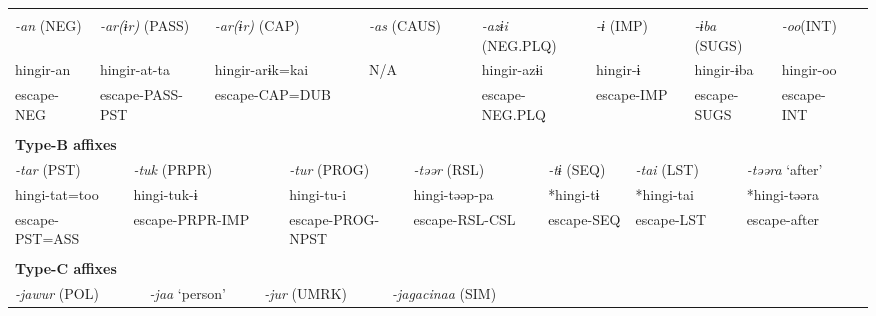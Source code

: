 \tabletail{}
\tablelasttail{}
\begin{tabularx}{\textwidth}{XXXXXXXXXXXXXXXXXXXXXXX}
\lsptoprule
\multicolumn{23}{X}{{\bfseries Type-A affixes}}\\
{ \textit{{}-an} (NEG)} & \multicolumn{5}{X}{{ \textit{{}-ar(ɨr)} (PASS)}} & \multicolumn{4}{X}{{ \textit{{}-ar(ɨr)} (CAP)}} & \multicolumn{4}{X}{{ \textit{{}-as} (CAUS)}} & \multicolumn{3}{X}{{ \textit{{}-azɨi} (NEG.PLQ)}} & \multicolumn{2}{X}{{ \textit{{}-ɨ} (IMP)}} & \multicolumn{2}{X}{{ \textit{{}-ɨba} (SUGS)}} & { \textit{{}-oo}(INT)} & \\
{ hingir-an} & \multicolumn{5}{X}{{ hingir-at-ta}} & \multicolumn{4}{X}{{ hingir-arɨk=kai}} & \multicolumn{4}{X}{{ N/A\footnotemark{}}} & \multicolumn{3}{X}{{ hingir-azɨi}} & \multicolumn{2}{X}{{ hingir-ɨ}} & \multicolumn{2}{X}{{ hingir-ɨba}} & { hingir-oo} & \\
escape-NEG & \multicolumn{5}{X}{escape-PASS-PST} & \multicolumn{4}{X}{escape-CAP=DUB} & \multicolumn{4}{X}{} & \multicolumn{3}{X}{escape-NEG.PLQ} & \multicolumn{2}{X}{escape-IMP} & \multicolumn{2}{X}{escape-SUGS} & escape-INT & \\
\multicolumn{23}{X}{}\\
\multicolumn{23}{X}{{\bfseries Type-B affixes}}\\
\multicolumn{3}{X}{{ \textit{{}-tar} (PST)}} & \multicolumn{5}{X}{{ \textit{{}-tuk} (PRPR)}} & \multicolumn{4}{X}{{ \textit{{}-tur} (PROG)}} & \multicolumn{3}{X}{{ \textit{{}-təər} (RSL)}} & \multicolumn{3}{X}{{ \textit{{}-tɨ} (SEQ)}} & \multicolumn{2}{X}{{ \textit{{}-tai} (LST)}} & \multicolumn{3}{X}{{ \textit{{}-təəra} ‘after’}}\\
\multicolumn{3}{X}{{ hingi-tat=too}} & \multicolumn{5}{X}{{ hingi-tuk-ɨ}} & \multicolumn{4}{X}{{ hingi-tu-i}} & \multicolumn{3}{X}{{ hingi-təəp-pa}} & \multicolumn{3}{X}{{ *hingi-tɨ}} & \multicolumn{2}{X}{{ *hingi-tai}} & \multicolumn{3}{X}{{ *hingi-təəra}}\\
\multicolumn{3}{X}{escape-PST=ASS} & \multicolumn{5}{X}{escape-PRPR-IMP} & \multicolumn{4}{X}{escape-PROG-NPST} & \multicolumn{3}{X}{escape-RSL-CSL} & \multicolumn{3}{X}{escape-SEQ} & \multicolumn{2}{X}{escape-LST} & \multicolumn{3}{X}{escape-after}\\
\multicolumn{3}{X}{} & \multicolumn{5}{X}{} & \multicolumn{4}{X}{} & \multicolumn{3}{X}{} & \multicolumn{3}{X}{} & \multicolumn{2}{X}{} & \multicolumn{3}{X}{}\\
\multicolumn{23}{X}{{\bfseries Type-C affixes}}\\
\multicolumn{4}{X}{{ \textit{{}-jawur} (POL)}} & \multicolumn{3}{X}{{ \textit{{}-jaa} ‘person’}} & \multicolumn{4}{X}{{ \textit{{}-jur} (UMRK)}} & \multicolumn{5}{X}{{ \textit{{}-jagacinaa} (SIM)}} & \multicolumn{7}{X}{}\\

\end{tabularx}
